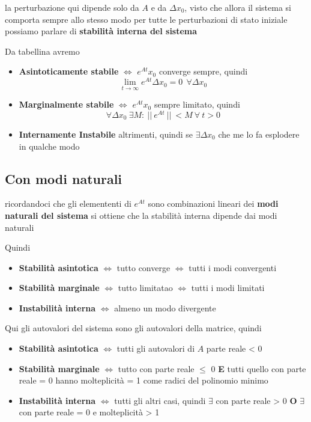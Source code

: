 \documentclass[11pt]{article}
\begin{document}
la perturbazione qui dipende solo da \(A\) e da \(\Delta x_0\), visto che allora il
sistema si comporta sempre allo stesso modo per tutte le perturbazioni di stato
iniziale possiamo parlare di \textbf{stabilità interna del sistema}

Da tabellina avremo

\begin{itemize}
\item \textbf{Asintoticamente stabile} $\iff$ \(e^{At}x_0\) converge sempre, quindi
\[\lim_{t \to \infty} e^{At} \Delta x_0 = 0\ \ \forall \Delta x_0\]
\item \textbf{Marginalmente stabile} $\iff$ \(e^{At}x_0\) sempre limitato, quindi
\[ \forall \Delta x_0\ \exists M :\
	  \lvert \lvert\ e^{At}\ \rvert \rvert\ < M\ \forall\ t > 0 \]
\item \textbf{Internamente Instabile} altrimenti, quindi se \(\exists \Delta x_0\)
che me lo fa esplodere in qualche modo
\end{itemize}

\subsection{Con modi naturali}
\label{sec:org3ddfb51}

ricordandoci che gli elemententi di \(e^{At}\) sono combinazioni lineari dei \textbf{modi
naturali del sistema} si ottiene che la stabilità interna dipende dai modi naturali

Quindi
\begin{itemize}
\item \textbf{Stabilità asintotica} $\iff$ tutto converge $\iff$ tutti i modi convergenti
\item \textbf{Stabilità marginale} $\iff$ tutto limitatao $\iff$ tutti i modi limitati
\item \textbf{Instabilità interna} $\iff$ almeno un modo divergente
\end{itemize}

Qui gli autovalori del sistema sono gli autovalori della matrice, quindi	  
\begin{itemize}
\item \textbf{Stabilità asintotica} $\iff$ tutti gli autovalori di \(A\) parte reale < 0
\item \textbf{Stabilità marginale} $\iff$ tutto con parte reale \(\le\) 0 \textbf{E} tutti quello
con parte reale = 0 hanno molteplicità = 1 come radici del polinomio minimo
\item \textbf{Instabilità interna} $\iff$ tutti gli altri casi, quindi \(\exists\) con
parte reale > 0 \textbf{O} \(\exists\) con parte reale = 0 e molteplicità > 1
\end{itemize}
\end{document}
